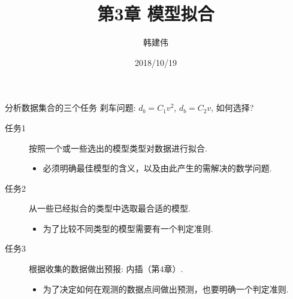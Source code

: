 \documentclass[UTF8]{ctexbeamer}
\title{第3章 模型拟合}
\author{韩建伟}
\institute{
  信息学院\\
  \texttt{hanjianwei@zjgsu.edu.cn}
}
\date{2018/10/19}
\begin{document}
\begin{frame}[plain]
  \titlepage{}
\end{frame}

\begin{frame}{分析数据集合的三个任务}
  刹车问题: $d_b=C_1v^2$, $d_b=C_2v$, 如何选择?

  \begin{description}
  \item[任务1] 按照一个或一些选出的模型类型对数据进行拟合.
    \begin{itemize}
    \item 必须明确最佳模型的含义，以及由此产生的需解决的数学问题.
    \end{itemize}
  \item[任务2] 从一些已经拟合的类型中选取最合适的模型.
    \begin{itemize}
    \item 为了比较不同类型的模型需要有一个判定准则.
    \end{itemize}
  \item[任务3] 根据收集的数据做出预报: 内插（第4章）.
    \begin{itemize}
    \item 为了决定如何在观测的数据点间做出预测，也要明确一个判定准则.
    \end{itemize}
  \end{description}

\end{frame}
\end{document}
